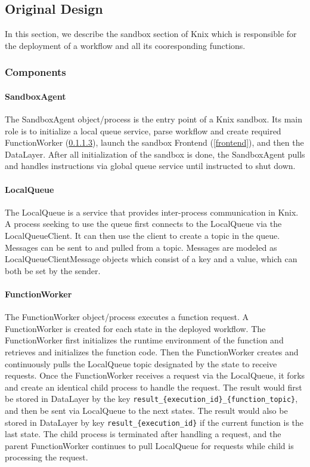 \documentclass[conference]{IEEEtran}
\begin{document}
\subsection{Original Design}

In this section, we describe the sandbox section of Knix which is responsible for the deployment of a workflow and all its cooresponding functions. 

\subsubsection{Components}

\paragraph{SandboxAgent}

The SandboxAgent object/process is the entry point of a Knix sandbox. Its main role is to initialize a local queue service, parse workflow and create required FunctionWorker (\ref{functionWorker}), launch the sandbox Frontend (\ref{frontend}), and then the DataLayer. After all initialization of the sandbox is done, the SandboxAgent pulls and handles instructions via global queue service until instructed to shut down.

\paragraph{LocalQueue}\label{localQueue}
The LocalQueue is a service that provides inter-process communication in Knix. A process seeking to use the queue first connects to the LocalQueue via the LocalQueueClient. It can then use the client to create a topic in the queue. Messages can be sent to and pulled from a topic. Messages are modeled as LocalQueueClientMessage objects which consist of a key and a value, which can both be set by the sender.

\paragraph{FunctionWorker}\label{functionWorker}
The FunctionWorker object/process executes a function request. A FunctionWorker is created for each state in the deployed workflow. The FunctionWorker first initializes the runtime environment of the function and retrieves and initializes the function code. Then the FunctionWorker creates and continuously pulls the LocalQueue topic designated by the state to receive requests. Once the FunctionWorker receives a request via the LocalQueue, it forks and create an identical child process to handle the request. The result would first be stored in DataLayer by the key \verb|result_{execution_id}_{function_topic}|, and then be sent via LocalQueue to the next states. The result would also be stored in DataLayer by key \verb|result_{execution_id}| if the current function is the last state. The child process is terminated after handling a request, and the parent FunctionWorker continues to pull LocalQueue for requests while child is processing the request.
\end{document}
